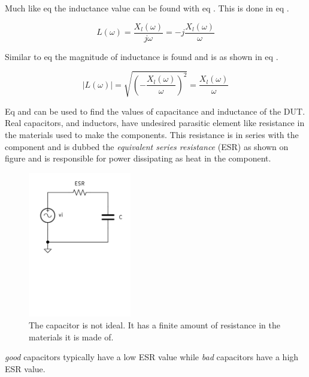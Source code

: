 Much like eq  the inductance value can be found with eq . This is done in eq .

\begin{equation}\label{eq:4_1_1_IndReactance2}
    L(\omega) = \frac{X_l(\omega)}{j\omega} = -j\frac{X_l(\omega)}{\omega}
\end{equation}

Similar to eq  the magnitude of inductance is found and is as shown in eq .

\begin{equation}\label{eq:4_1_1_IndReactance3}
    |L(\omega)| = \sqrt{\left(-\frac{X_l(\omega)}{\omega}\right)^2} = \frac{X_l(\omega)}{\omega}
\end{equation}


Eq  and  can be used to find the values of capacitance and inductance of the DUT. Real capacitors, and inductors, have undesired parasitic element like resistance in the materials used to make the components. This resistance is in series with the component and is dubbed the \textit{equivalent series resistance} (ESR) as shown on figure  and is responsible for power dissipating as heat in the component.
\begin{figure}[H]
    \centering
    \includegraphics[clip, trim=0 350 0 0, width=0.4\textwidth]{Sections/4_TechnicalAnalysis/Figures/4_1_1_CapESR.pdf}
    \caption{The capacitor is not ideal. It has a finite amount of resistance in the materials it is made of.}
    \label{fig:4_1_1_CapESR}
\end{figure}

\textit{good} capacitors typically have a low ESR value while \textit{bad} capacitors have a high ESR value. 